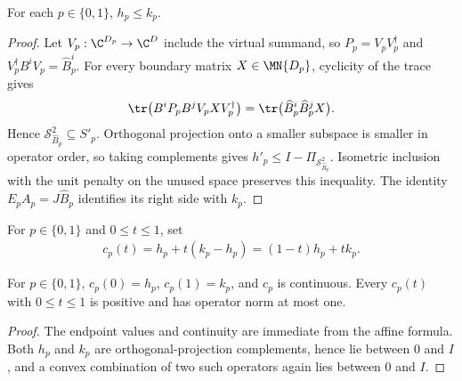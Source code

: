 \begin{lemma}
    \label{thm:mpo_arbitrary_endpoint_parent_order}
    \leanok
    For each $p\in\{0,1\}$, $h_p\leq k_p$.
\end{lemma}
\begin{proof}
    \leanok
    Let $V_p:\C^{D_p}\to\C^D$ include the virtual summand, so
    $P_p=V_pV_p^\dagger$ and $V_p^\dagger B^iV_p=\widehat B_p^i$.
    For every boundary matrix $X\in\MN{D_p}$, cyclicity of the trace gives
    \begin{align}
        \tr\bigl(B^iP_pB^jV_pXV_p^\dagger\bigr)
        =\tr\bigl(\widehat B_p^i\widehat B_p^jX\bigr).
    \end{align}
    Hence $\mathcal S^2_{\widehat B_p}\subseteq S'_p$.
    Orthogonal projection onto a smaller subspace is smaller in operator
    order, so taking complements gives $h'_p\leq
        I-\Pi_{\mathcal S^2_{\widehat B_p}}$. Isometric inclusion with the
    unit penalty on the unused space preserves this inequality. The identity
    $E_pA_p=J\widehat B_p$ identifies its right side with $k_p$.
\end{proof}

\begin{definition}
    \label{def:mpo_arbitrary_endpoint_attachment}
    \leanok
    For $p\in\{0,1\}$ and $0\leq t\leq1$, set
    \begin{align}
        c_p(t)=h_p+t(k_p-h_p)=(1-t)h_p+tk_p.
    \end{align}
\end{definition}

\begin{lemma}
    \label{thm:mpo_arbitrary_endpoint_attachment_properties}
    \leanok
    For $p\in\{0,1\}$, $c_p(0)=h_p$, $c_p(1)=k_p$, and $c_p$ is continuous.
    Every $c_p(t)$ with $0\leq t\leq1$ is positive and has operator norm at
    most one.
\end{lemma}
\begin{proof}
    \leanok
    The endpoint values and continuity are immediate from the affine formula.
    Both $h_p$ and $k_p$ are orthogonal-projection complements, hence lie
    between $0$ and $I$, and a convex combination of two such operators
    again lies between $0$ and $I$.
\end{proof}

